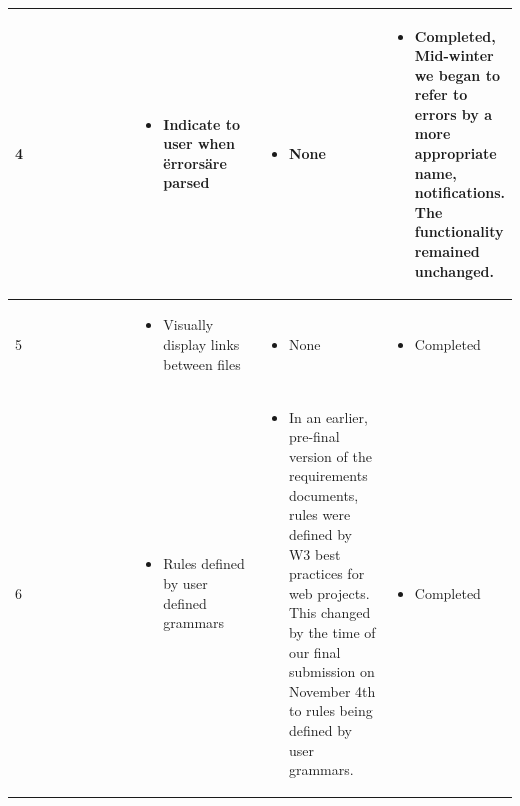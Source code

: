 \documentclass[letterpaper,10pt,titlepage,draftclsnofoot,onecolumn,onesided] {IEEEtran}
\begin{document}
{\begin{center}
\begin{singlespace}
\begin{tabular}{ |  p{0.25\linewidth}  |  p{0.25\linewidth}  | p{0.25\linewidth} | p{0.25\linewidth} |}
        \\ \hline

            4
		& 
			\begin{itemize}
				\item Indicate to user when \"errors\" are parsed
			\end{itemize}
		& 
			\begin{itemize}
				\item None
			\end{itemize}
		&
			\begin{itemize}
				\item Completed, Mid-winter we began to refer to errors by a more appropriate name, notifications. 
                The functionality remained unchanged.
			\end{itemize} 
		
        \\ \hline

        	5
		& 
			\begin{itemize}
				\item Visually display links between files
			\end{itemize}
		& 
			\begin{itemize}
				\item None
			\end{itemize}
		&
			\begin{itemize}
				\item Completed
			\end{itemize} 
		
        \\ \hline

        	6
		& 
			\begin{itemize}
				\item Rules defined by user defined grammars
			\end{itemize}
		& 
			\begin{itemize}
				\item In an earlier, pre-final version of the requirements documents, rules were defined by W3 best practices for web projects.
                This changed by the time of our final submission on November 4th to rules being defined by user grammars.
			\end{itemize}
		&
			\begin{itemize}
				\item Completed
			\end{itemize} 
		
        \\ \hline


\end{tabular}
\end{singlespace}
\end{center}}
\end{document}
